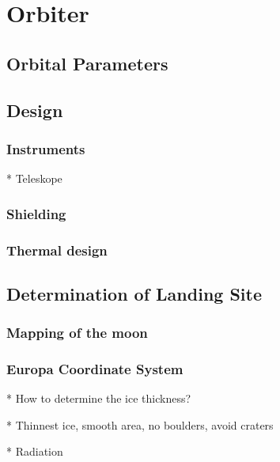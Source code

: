 \section{Orbiter}

\subsection{Orbital Parameters}

\subsection{Design}

\subsubsection{Instruments}

* Teleskope

\subsubsection{Shielding}

\subsubsection{Thermal design}

\subsection{Determination of Landing Site}

\subsubsection{Mapping of the moon}

\subsubsection{Europa Coordinate System}

* How to determine the ice thickness?

* Thinnest ice, smooth area, no boulders, avoid craters

* Radiation
